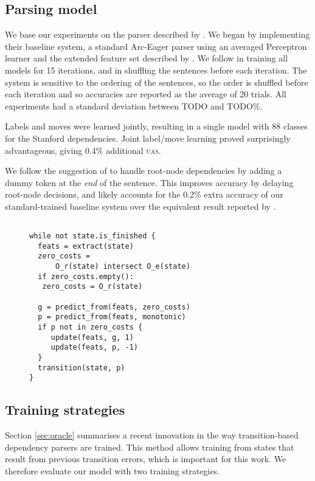 \documentclass[11pt,letterpaper]{article}
\newcommand{\uas}{\textsc{uas}\xspace}
\begin{document}
\subsection{Parsing model}

We base our experiments on the parser described by \citet{goldberg:12}. We
began by implementing their baseline system, a standard Arc-Eager parser using
an averaged Perceptron learner and the extended feature set described by \citet{zhang:11}.
We follow \citeauthor{goldberg:12} in training all models for 15 iterations,
and in shuffling the sentences before each iteration.
The system is sensitive to the ordering of the sentences, so
the order is shuffled before each iteration and
so accuracies are reported as the average of 20 trials. All experiments had a
standard deviation between TODO and TODO\%.

Labels and moves were learned jointly, resulting in a single model with 88 classes
for the Stanford dependencies. Joint label/move learning proved surprisingly
advantageous, giving 0.4\% additional \uas.

We follow the suggestion of \citet{nivre:squib} to handle root-node dependencies by
adding a dummy token at the \emph{end} of the sentence.
This improves accuracy by delaying root-node decisions, and likely accounts for the
0.2\% extra accuracy of our standard-trained baseline system over the equivalent result
reported by \citet{goldberg:12}.

\begin{figure}
\begin{verbatim}

while not state.is_finished {
  feats = extract(state)
  zero_costs =
      O_r(state) intersect O_e(state)
  if zero_costs.empty():
   zero_costs = O_r(state)

  g = predict_from(feats, zero_costs)
  p = predict_from(feats, monotonic)
  if p not in zero_costs {
     update(feats, g, 1)
     update(feats, p, -1)
  }
  transition(state, p)
}
\end{verbatim}
\end{figure}



\subsection{Training strategies}

Section \ref{sec:oracle} summarises a recent innovation in the way transition-based
dependency parsers are trained. This method allows training from states that
result from previous transition errors, which is
important for this work. We therefore evaluate our model with two training strategies.
\end{document}
